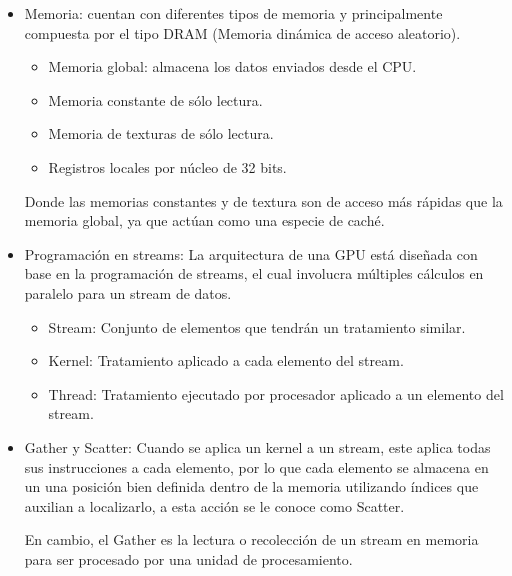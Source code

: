 \begin{itemize}
\item Memoria: cuentan con diferentes tipos de memoria y principalmente compuesta por el tipo DRAM (Memoria dinámica de acceso aleatorio).
	\begin{itemize}
	\item Memoria global: almacena los datos enviados desde el CPU.
	\item Memoria constante de sólo lectura.
	\item Memoria de texturas de sólo lectura.
	\item Registros locales por núcleo de 32 bits. 
	\end{itemize}
Donde las memorias constantes y de textura son de acceso más rápidas que la memoria global, ya que actúan como una especie de caché.

\item Programación en streams: La arquitectura de una GPU está diseñada con base en la programación de streams, el cual involucra múltiples cálculos en paralelo para un stream de datos\cite{stream}. 

	\begin{itemize}
	\item Stream: Conjunto de elementos que tendrán un tratamiento similar.
	\item Kernel: Tratamiento aplicado a cada elemento del stream.
	\item Thread: Tratamiento ejecutado por procesador aplicado a un elemento del stream.
	\end{itemize} 
	\item Gather y Scatter: Cuando se aplica un kernel a un stream, este aplica todas sus instrucciones a cada elemento, por lo que cada elemento se almacena en un una posición bien definida dentro de la memoria utilizando índices que auxilian a localizarlo, a esta acción se le conoce como Scatter. 

   
En cambio, el Gather es la lectura o recolección de un stream en memoria para ser procesado por una unidad de procesamiento.


\end{itemize} 
    
